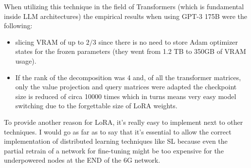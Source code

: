 When utilizing this technique in the field of Transformers (which is fundamental inside LLM
architectures) the empirical results when using GPT-3 175B were the following:
\begin{itemize}
	\item slicing VRAM of up to $2/3$ since there is no need to store Adam optimizer states for
		the frozen parameters (they went from 1.2 TB to 350GB of VRAM usage).
	\item If the rank of the decomposition was 4 and, of all the transformer matrices, only the
		value projection and query matrices were adapted the checkpoint size is reduced of
		circa 10000 times which in turns means very easy model switching due to the
		forgettable size of LoRA weights.
\end{itemize}
To provide another reason for LoRA, it's really easy to implement next to other techniques. I would
go as far as to say that it's essential to allow the correct implementation of distributed
learning techniques like SL because even the partial retrain of a network for fine-tuning might be
too expensive for the underpowered nodes at the END of the 6G network.
